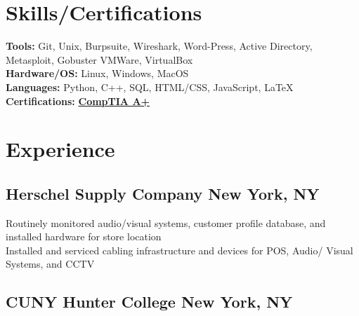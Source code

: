 \documentclass[a4paper]{Resume}
\begin{document}
\begin{onehalfspace}
\sectionsep

\section{Skills/Certifications} 
\hrulefill

\pt \textbf{Tools:} Git, Unix, Burpsuite, Wireshark, Word-Press, Active Directory, Metasploit, Gobuster VMWare, VirtualBox \\

\pt \textbf{Hardware/OS:}  Linux, Windows, MacOS  \\

\pt \textbf{Languages:}  Python, C++, SQL, HTML/CSS, JavaScript, LaTeX \\

\pt \textbf{Certifications:} \href{https://www.udemy.com/certificate/UC-98f894dc-4e81-4be3-aeb9-21b391568400/}{\textbf{CompTIA A+}} \\
\sectionsep


\section{Experience} 
\hrulefill 

\subsection{Herschel Supply Company \hfill \normalfont New York, NY}

\pt Routinely monitored audio/visual systems, customer profile database, and installed hardware for store location \\

\pt Installed and serviced cabling infrastructure and devices for POS, Audio/ Visual Systems, and CCTV \\

\sectionsep


\subsection{CUNY Hunter College \hfill \normalfont New York, NY}


\end{onehalfspace}
\end{document}
